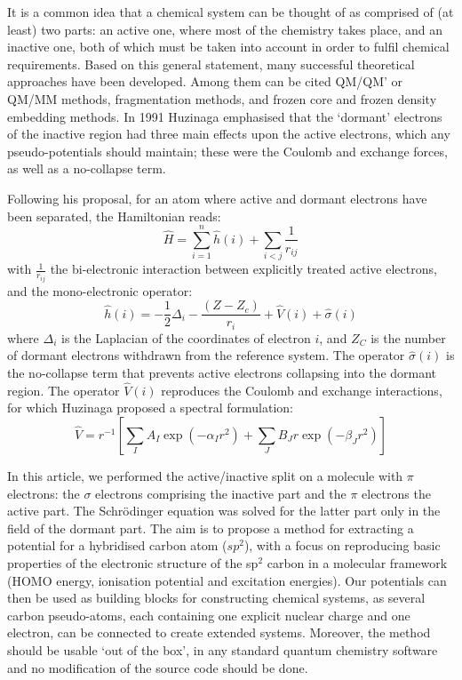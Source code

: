 \documentclass[12pt]{article}
\begin{document}
It is a common idea that a chemical system can be thought of as comprised of (at least) 
two parts:
an active one, where most of the chemistry takes place, and an inactive one, both of which must be taken into account in order to fulfil chemical requirements.
Based on this general statement, many successful theoretical approaches have been developed. Among them can be cited QM/QM' or QM/MM methods,\cite{chung_oniom_2015} fragmentation methods,
\cite{gordon_effective_2001,
steinmann_effective_2012,collins_energy-based_2015} and frozen core and frozen density embedding methods.\cite{assfeld_quantum_1996,jacob_calculation_2006,wesolowski_frozen-density_2015}
In 1991 Huzinaga emphasised that the `dormant' electrons of the inactive region had three main effects upon the active electrons, which any pseudo-potentials should maintain; these were the Coulomb and exchange forces, as well as a no-collapse term.\cite{huzinaga_effective_1991}

Following his proposal, for an atom where active and dormant electrons have been separated, the Hamiltonian reads:
\begin{equation}
\label{eq:atomicHamiltonian}
\hat{H} = \sum_{i=1}^n \hat{h}(i) +\sum_{i<j}\frac{1}{r_{ij}}
\end{equation}
with $\frac{1}{r_{ij}}$ the bi-electronic interaction
between explicitly treated active electrons, and
the mono-electronic operator:
\begin{equation}
\label{eq:monoElectronicOperator}
\hat{h}(i) = -\frac{1}{2}\Delta_i - \frac{(Z-Z_c)}{r_i}+\hat{V}(i) + \hat{\sigma}(i)
\end{equation}
where $\Delta_i$ is the Laplacian of the coordinates of electron $i$, and 
$Z_C$ is the number of dormant electrons withdrawn from the reference system.
The operator $\hat{\sigma}(i)$ is the no-collapse term that prevents active electrons
collapsing into the dormant region. The operator $\hat{V}(i)$ reproduces the 
Coulomb and exchange interactions, for which Huzinaga proposed a spectral formulation:
\begin{equation}
\label{eq:HuzinagaMPVersion1Potential}
\hat{V} = r^{-1}\left[\sum_IA_I\exp(-\alpha_I r^2)+\sum_JB_Jr\exp(-\beta_J r^2)\right]
\end{equation}

In this article, we performed the active/inactive split on a molecule with $\pi$ electrons: the $\sigma$ electrons comprising the inactive part and the $\pi$ electrons the active part.
The Schr\"odinger equation was solved for the latter part only in the field of the dormant part.
The aim is to propose a method for extracting a potential for a hybridised carbon atom 
($sp^2$), with a focus on reproducing basic properties of the electronic structure of the sp$^2$ carbon in a molecular framework 
(HOMO energy, ionisation potential and excitation energies). Our potentials can then be used as 
building blocks for constructing chemical systems, as several carbon pseudo-atoms,
each containing one explicit nuclear charge and one electron, can be connected to create extended
systems.
Moreover, the method should be usable `out of the box', in any standard quantum chemistry software
and no modification of the source code should be done.
\end{document}

